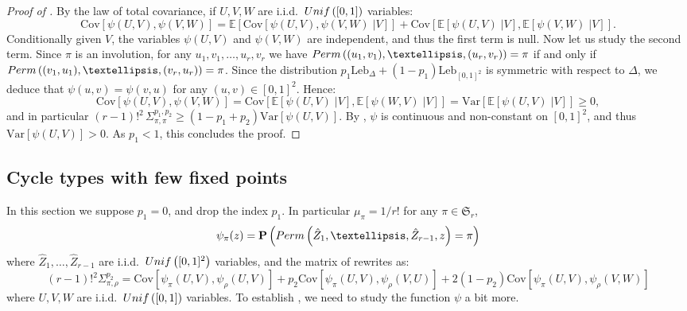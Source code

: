 \documentclass{article}
\theoremstyle{remark}
\def\m{\!-\!}
\def\p{\!+\!}
\newcommand{\mean}[1]{\mathbb{E}\left[#1\right]}
\newcommand{\prob}[1]{\mathbf{P}\left(#1\right)}
\newcommand{\var}[1]{\mathrm{Var}\left[#1\right]}
\newcommand{\cov}[2]{\mathrm{Cov}\left[#1,#2\right]}
\def\Leb{\mathrm{Leb}}
\newcommand{\Unif}[1]{{\rm Unif}\left(#1\right)}
\def\S{\mathfrak{S}}
\def\carre{[0,1]^2}
\newcommand{\perm}[1]{{\rm Perm}\left(#1\right)}
\begin{document}
\begin{proof}[Proof of ]
    By the law of total covariance, if $U,V,W$ are i.i.d.~$\Unif{[0,1]}$ variables:
    \begin{equation*}
        \cov{\psi(U,V)}{\psi(V,W)} = 
        \mean{\cov{\psi(U,V)}{\psi(V,W)\;\big|V}}
        + \cov{\mean{\psi(U,V)\;\big| V}}{\mean{\psi(V,W)\;\big| V}} .
    \end{equation*}
    Conditionally given $V$, the variables $\psi(U,V)$ and $\psi(V,W)$ are independent, and thus the first term is null.
    Now let us study the second term.
    Since $\pi$ is an involution, for any $u_1,v_1,\dots,u_r,v_r$ we have $\perm{(u_1,v_1),\dots,(u_r,v_r)}=\pi$ if and only if $\perm{(v_1,u_1),\dots,(v_r,u_r)}=\pi$.
    Since the distribution $p_1\Leb_\Delta + (1-p_1)\Leb_{\carre}$ is symmetric with respect to $\Delta$, we deduce that $\psi(u,v)=\psi(v,u)$ for any $(u,v)\in\carre$.
    Hence:
    \begin{equation*}
        \cov{\psi(U,V)}{\psi(V,W)}
        = \cov{\mean{\psi(U,V)\;\big| V}}{\mean{\psi(W,V)\;\big| V}}
        = \var{\mean{\psi(U,V)\;\big| V}}
        \ge 0 ,
    \end{equation*}
    and in particular $(r-1)!^2\, \Sigma_{\pi,\pi}^{p_1,p_2}\ge (1\m p_1\p p_2)\var{\psi(U,V)}$.
    By , $\psi$ is continuous and non-constant on $\carre$, and thus $\var{\psi(U,V)}>0$.
    As $p_1<1$, this concludes the proof.
\end{proof}


\subsection{Cycle types with few fixed points}

In this section we suppose $p_1=0$, and drop the index $p_1$.
In particular $\mu_\pi = 1/r!$ for any $\pi\in\S_r$,
\begin{equation*}
    \psi_\pi(z) = \prob{\perm{\hat Z_1,\dots,\hat Z_{r-1},z}=\pi}
\end{equation*}
where $\hat Z_1,\dots,\hat Z_{r-1}$ are i.i.d.~$\Unif{\carre}$ variables, and the matrix of  rewrites as:
\begin{equation*}
    (r\m1)!^2 \Sigma_{\pi,\rho}^{p_2} = \cov{\psi_\pi(U,V)}{\psi_\rho(U,V)} + p_2\cov{\psi_\pi(U,V)}{\psi_\rho(V,U)}
    + 2(1\m p_2)\cov{\psi_\pi(U,V)}{\psi_\rho(V,W)}
\end{equation*}
where $U,V,W$ are i.i.d.~$\Unif{[0,1]}$ variables.
To establish , we need to study the function $\psi$ a bit more.
\end{document}
